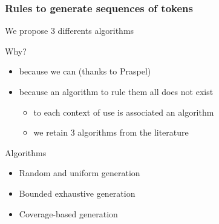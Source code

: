 \documentclass[9pt]{beamer}
\begin{document}
\begin{frame}
\frametitle{Rules to generate sequences of tokens}

We propose 3 differents algorithms

\begin{block}{Why?}
\begin{itemize}
\item because we can (thanks to Praspel)
\item because an algorithm to rule them all does not exist
  \begin{itemize}
  \item to each context of use is associated an algorithm
  \item we retain 3 algorithms from the literature
  \end{itemize}
\end{itemize}
\end{block}

\begin{block}{Algorithms}
\begin{itemize}
\item Random and uniform generation
\item Bounded exhaustive generation
\item Coverage-based generation
\end{itemize}
\end{block}

\end{frame}
\end{document}
